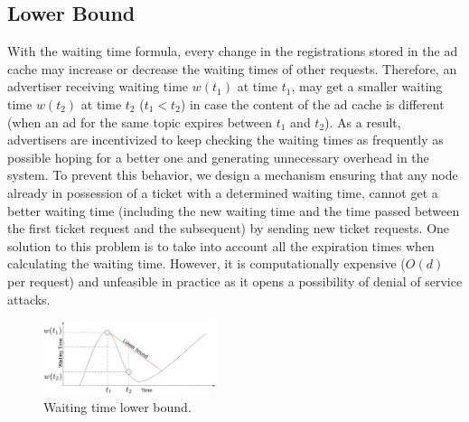 \subsection{Lower Bound}
With the waiting time formula, every change in the registrations stored in the ad cache may increase or decrease the waiting times of other requests. 
Therefore, an advertiser receiving waiting time $w(t_1)$ at time $t_1$, may get a smaller waiting time $w(t_2)$ at time $t_2$ ($t_1 < t_2$) in case the content of the ad cache is different (\eg when an ad for the same topic expires between $t_1$ and $t_2$). 
As a result, advertisers are incentivized to keep checking the waiting times as frequently as possible hoping for a better one and generating unnecessary overhead in the system.
To prevent this behavior, we design a mechanism ensuring that any node already in possession of a ticket with a determined waiting time, cannot get a better waiting time (including the new waiting time and the time passed between the first ticket request and the subsequent) by sending new ticket requests.
One solution to this problem is to take into account all the expiration times when calculating the waiting time. 
However, it is computationally expensive (\eg $O(d)$ per request) and unfeasible in practice as it opens a possibility of denial of service attacks. 

\begin{figure}
    \includegraphics[width=0.45\textwidth]{img/lower_bound.png}
    \vspace{-0.05in}
    \caption{Waiting time lower bound.}
    \label{fig:lower_bound}
    \vspace{-0.15in}
\end{figure}

